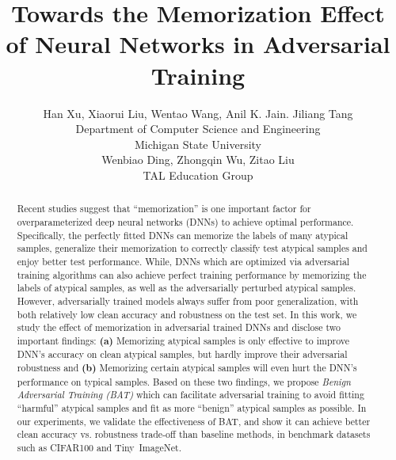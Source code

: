 \documentclass{article}
\title{Towards the Memorization Effect of Neural Networks in Adversarial Training}
\author{%
  Han Xu, Xiaorui Liu, Wentao Wang, Anil K. Jain. Jiliang Tang\\ 
  Department of Computer Science and Engineering\\
  Michigan State University\\
  \And Wenbiao Ding, Zhongqin Wu, Zitao Liu\\
  TAL Education Group\\
  
}
\newcommand{\jt}[1]{\textcolor{brown}{#1}}
\begin{document}
\maketitle

\begin{abstract}
Recent studies suggest that ``memorization'' is one important factor for overparameterized deep neural networks (DNNs) to achieve optimal performance. Specifically, the perfectly fitted DNNs can memorize the labels of many atypical samples, generalize their memorization to correctly classify test atypical samples and enjoy better test performance. While, DNNs which are optimized via adversarial training algorithms can also achieve perfect training performance by memorizing the labels of atypical samples, as well as the adversarially perturbed atypical samples. However, adversarially trained models always suffer from poor generalization, with both relatively low clean accuracy and robustness on the test set. In this work, we study the effect of memorization in adversarial trained DNNs and disclose two important findings: \textbf{(a)} Memorizing atypical samples is only effective to improve DNN's accuracy on clean atypical samples, but hardly improve their adversarial robustness and \textbf{(b)} Memorizing certain atypical samples will even hurt the DNN's performance on typical samples. Based on these two findings, we propose \textit{Benign Adversarial Training (BAT)} which can facilitate adversarial training to avoid fitting ``harmful'' atypical samples and fit as more ``benign'' atypical samples as possible. In our experiments, we validate the effectiveness of BAT, and show it can achieve better clean accuracy vs. robustness trade-off than baseline methods, in benchmark datasets such as CIFAR100 and Tiny~ImageNet.


\end{abstract}










%






\end{document}
